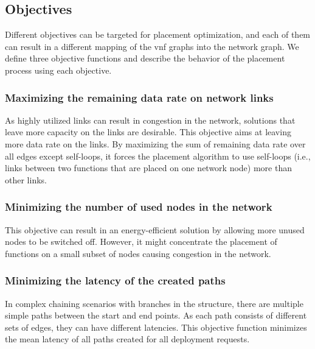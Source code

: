 \documentclass[10pt,a4paper,conference]{IEEEtran}
\begin{document}
\subsection{Objectives}
\label{subsec:objective}

Different objectives can be targeted for placement optimization, and
each of them can result in a different mapping of the \ac{vnf} graphs into the 
network graph. We define three objective functions and describe 
the behavior of the placement process using each objective.

\subsubsection{Maximizing the remaining data rate on network links}
\vspace{-1mm}
{\footnotesize
}As highly utilized links can result in congestion in the network, solutions that
leave more capacity on the links are desirable. This objective
aims at leaving more data rate on the links. By maximizing the sum of remaining
data rate over all edges except self-loops, it forces the placement 
algorithm to use self-loops (i.e., links between two functions that
are placed on one network node) more than other links.
 
\subsubsection{Minimizing the number of used nodes in the network}
\vspace{-1mm}
{\footnotesize

}This objective can result in an energy-efficient solution by allowing more unused 
nodes to be switched off. However, it might concentrate the placement
of functions on a small subset of nodes causing congestion in the network.

\subsubsection{Minimizing the latency of the created paths}
\vspace{-1mm}
{\footnotesize

}In complex chaining scenarios with branches in the structure, there are multiple simple
paths between the start and end points. As each path consists of different sets of
edges, they can have different latencies. This objective function minimizes the
mean latency of all paths created for all deployment requests.
\end{document}
